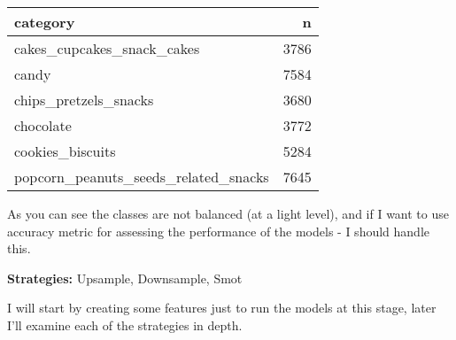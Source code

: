 \documentclass[
]{article}
\newenvironment{Shaded}{\begin{snugshade}}{\end{snugshade}}
\newcommand{\CommentTok}[1]{\textcolor[rgb]{0.56,0.35,0.01}{\textit{#1}}}
\newcommand{\ControlFlowTok}[1]{\textcolor[rgb]{0.13,0.29,0.53}{\textbf{#1}}}
\newcommand{\DataTypeTok}[1]{\textcolor[rgb]{0.13,0.29,0.53}{#1}}
\newcommand{\DecValTok}[1]{\textcolor[rgb]{0.00,0.00,0.81}{#1}}
\newcommand{\FloatTok}[1]{\textcolor[rgb]{0.00,0.00,0.81}{#1}}
\newcommand{\KeywordTok}[1]{\textcolor[rgb]{0.13,0.29,0.53}{\textbf{#1}}}
\newcommand{\NormalTok}[1]{#1}
\newcommand{\OperatorTok}[1]{\textcolor[rgb]{0.81,0.36,0.00}{\textbf{#1}}}
\newcommand{\OtherTok}[1]{\textcolor[rgb]{0.56,0.35,0.01}{#1}}
\newcommand{\StringTok}[1]{\textcolor[rgb]{0.31,0.60,0.02}{#1}}
\begin{document}
\begin{table}[H]
\centering\begingroup\fontsize{8}{10}\selectfont

\begin{tabular}{lr}
\toprule
category & n\\
\midrule
\rowcolor{gray!6}  cakes\_cupcakes\_snack\_cakes & 3786\\
candy & 7584\\
\rowcolor{gray!6}  chips\_pretzels\_snacks & 3680\\
chocolate & 3772\\
\rowcolor{gray!6}  cookies\_biscuits & 5284\\
\addlinespace
popcorn\_peanuts\_seeds\_related\_snacks & 7645\\
\bottomrule
\end{tabular}
\endgroup{}
\end{table}

As you can see the classes are not balanced (at a light level), and if I
want to use accuracy metric for assessing the performance of the models
- I should handle this.

\textbf{Strategies:} Upsample, Downsample, Smot

I will start by creating some features just to run the models at this
stage, later I'll examine each of the strategies in depth.

\begin{Shaded}
\end{Shaded}
\end{document}
